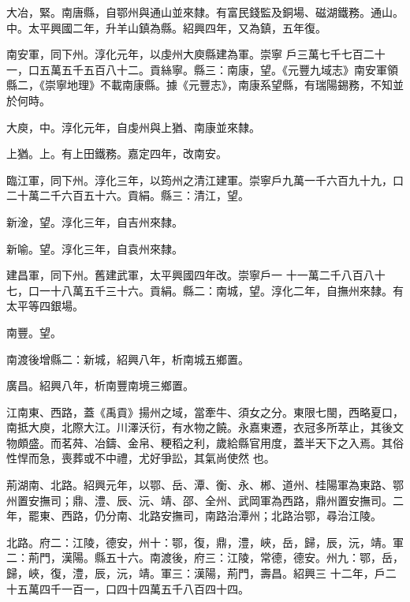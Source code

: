 \begin{pinyinscope}
 大冶，緊。南唐縣，自鄂州與通山並來隸。有富民錢監及銅場、磁湖鐵務。通山。中。太平興國二年，升羊山鎮為縣。紹興四年，又為鎮，五年復。



 南安軍，同下州。淳化元年，以虔州大庾縣建為軍。崇寧
 戶三萬七千七百二十一，口五萬五千五百八十二。貢絲寧。縣三：南康，望。《元豐九域志》南安軍領縣二，《崇寧地理》不載南康縣。據《元豐志》，南康系望縣，有瑞陽錫務，不知並於何時。



 大庾，中。淳化元年，自虔州與上猶、南康並來隸。



 上猶。上。有上田鐵務。嘉定四年，改南安。



 臨江軍，同下州。淳化三年，以筠州之清江建軍。崇寧戶九萬一千六百九十九，口二十萬二千六百五十六。貢絹。縣三：清江，望。



 新淦，望。淳化三年，自吉州來隸。



 新喻。望。淳化三年，自袁州來隸。



 建昌軍，同下州。舊建武軍，太平興國四年改。崇寧戶一
 十一萬二千八百八十七，口一十八萬五千三十六。貢絹。縣二：南城，望。淳化二年，自撫州來隸。有太平等四銀場。



 南豐。望。



 南渡後增縣二：新城，紹興八年，析南城五鄉置。



 廣昌。紹興八年，析南豐南境三鄉置。



 江南東、西路，蓋《禹貢》揚州之域，當牽牛、須女之分。東限七閩，西略夏口，南抵大庾，北際大江。川澤沃衍，有水物之饒。永嘉東遷，衣冠多所萃止，其後文物頗盛。而茗荈、冶鑄、金帛、粳稻之利，歲給縣官用度，蓋半天下之入焉。其俗性悍而急，喪葬或不中禮，尤好爭訟，其氣尚使然
 也。



 荊湖南、北路。紹興元年，以鄂、岳、潭、衡、永、郴、道州、桂陽軍為東路、鄂州置安撫司；鼎、澧、辰、沅、靖、邵、全州、武岡軍為西路，鼎州置安撫司。二年，罷東、西路，仍分南、北路安撫司，南路治潭州；北路治鄂，尋治江陵。



 北路。府二：江陵，德安，州十：鄂，復，鼎，澧，峽，岳，歸，辰，沅，靖。軍二：荊門，漢陽。縣五十六。南渡後，府三：江陵，常德，德安。州九：鄂，岳，歸，峽，復，澧，辰，沅，靖。軍三：漢陽，荊門，壽昌。紹興三
 十二年，戶二十五萬四千一百一，口四十四萬五千八百四十四。




\end{pinyinscope}

